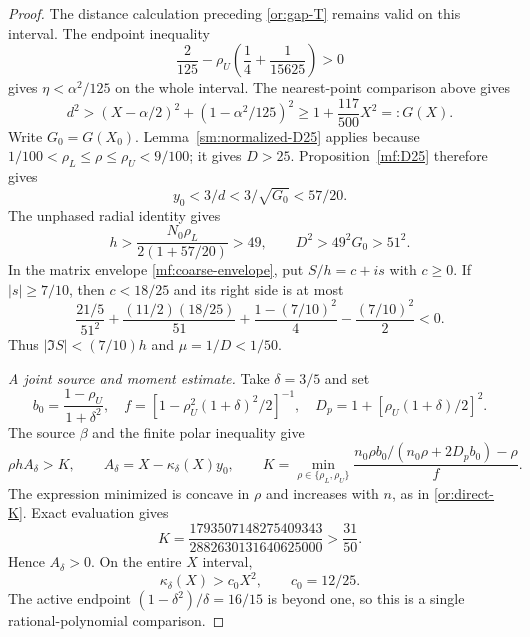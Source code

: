 \begin{proof}
The distance calculation preceding \eqref{or:gap-T} remains
valid on this interval. The endpoint inequality
\[
 \frac2{125}-\rho_U\left(\frac14+\frac1{15625}\right)>0
\]
gives $\eta<\alpha^2/125$ on the whole interval.
The nearest-point comparison above gives
\[
 d^2>(X-\alpha/2)^2+(1-\alpha^2/125)^2
 \ge1+\frac{117}{500}X^2=:G(X).
\]
Write $G_0=G(X_0)$.
Lemma~\ref{sm:normalized-D25} applies because
$1/100<\rho_L\le\rho\le\rho_U<9/100$; it gives $D>25$.
Proposition~\ref{mf:D25} therefore gives
\[
 y_0<3/d<3/\sqrt{G_0}<57/20.
\]
The unphased radial identity gives
\[
 h>\frac{N_0\rho_L}{2(1+57/20)}>49,\qquad
 D^2>49^2G_0>51^2.
\]
In the matrix envelope \eqref{mf:coarse-envelope}, put
$S/h=c+is$ with $c\ge0$.
If $|s|\ge7/10$, then $c<18/25$ and its right side is at most
\[
 \frac{21/5}{51^2}
 +\frac{(11/2)(18/25)}{51}
 +\frac{1-(7/10)^2}{4}-\frac{(7/10)^2}{2}<0.
\]
Thus $|\Im S|<(7/10)h$ and $\mu=1/D<1/50$.

\smallskip
\noindent\emph{A joint source and moment estimate.}
Take $\delta=3/5$ and set
\[
 b_0=\frac{1-\rho_U}{1+\delta^2},\quad
 f=[1-\rho_U^2(1+\delta)^2/2]^{-1},\quad
 D_p=1+[\rho_U(1+\delta)/2]^2.
\]
The source $\beta$ and the finite polar inequality give
\begin{equation}\label{sm:highX-K}
 \rho h A_\delta>K,\qquad
 A_\delta=X-\kappa_\delta(X)y_0,\qquad
 K=\min_{\rho\in\{\rho_L,\rho_U\}}
 \frac{n_0\rho b_0/(n_0\rho+2D_pb_0)-\rho}{f}.
\end{equation}
The expression minimized is concave in $\rho$ and increases
with $n$, as in \eqref{or:direct-K}. Exact evaluation gives
\[
 K=\frac{1793507148275409343}{2882630131640625000}
       >\frac{31}{50}.
\]
Hence $A_\delta>0$.
On the entire $X$ interval,
\begin{equation}\label{sm:highX-kappa}
 \kappa_\delta(X)>c_0X^2,\qquad c_0=12/25.
\end{equation}
The active endpoint $(1-\delta^2)/\delta=16/15$ is beyond one,
so this is a single rational-polynomial comparison.


\end{proof}
